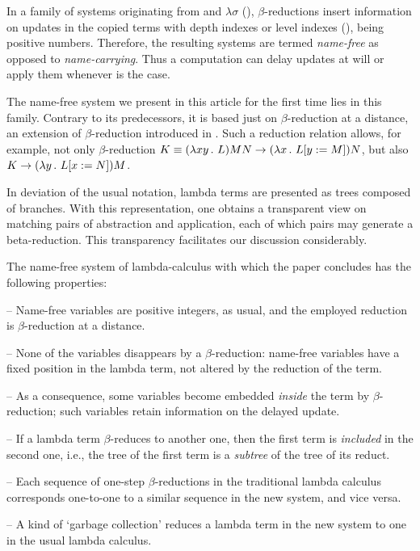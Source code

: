 \documentclass{article}
\theoremstyle{plain}
\theoremstyle{definition}
\begin{document}
In a family of systems originating from \cite{deB78b}
and $\lambda\sigma$ (\citealp{Aba91}),
$\beta$-reductions insert information on updates in the copied terms
with depth indexes or level indexes (\citealp{deB72}),  being positive numbers. Therefore, the resulting systems are termed {\em name-free\/} as opposed to {\em name-carrying\/}.
Thus a computation can delay updates at will
or apply them whenever is the case.

The name-free system we present in this article for the first time
lies in this family. Contrary to its predecessors,
it is based just on $\beta$-reduction at a distance,
an extension of $\beta$-reduction introduced in \cite{Ned73}. %
Such a reduction relation allows, for example, not only $\beta$-reduction $K \equiv (\lambda x y \, . \,\, L) M N \rightarrow (\lambda x \, . \,\, L[y := M])N$, but also $K \rightarrow (\lambda y \, . \,\, L[x := N])M$.


In deviation of the usual notation, lambda terms %
are presented as trees composed of branches. With this representation, one obtains a transparent view on matching pairs of abstraction and application, each of which pairs may generate a beta-reduction. This transparency facilitates our discussion considerably.

The name-free system of lambda-calculus with %
which the paper concludes has the following properties:

-- Name-free variables are positive integers, as usual, and the employed reduction is $\beta$-reduction at a distance.

-- None of the variables disappears by a $\beta$-reduction: name-free variables have a fixed position in the lambda term, not altered by the reduction of the term.

-- As a consequence, some variables become embedded {\em inside\/} the term by $\beta$-reduction; such variables retain information on the delayed update.

-- If a lambda term $\beta$-reduces to another one, then the first term is {\em included\/} in the second one, i.e., the tree of the first term is a {\em subtree\/} of the tree of its reduct.

-- Each sequence of one-step $\beta$-reductions in the traditional lambda calculus corresponds one-to-one to a similar sequence in the new system, and vice versa.

-- A kind of `garbage collection' reduces a lambda term in the new system to one in the usual lambda calculus.
\end{document}
